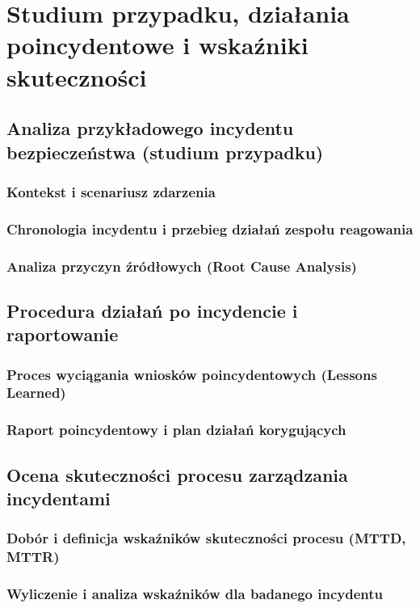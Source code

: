 \chapter{Studium przypadku, działania poincydentowe i wskaźniki skuteczności}\label{ch:studium-przypadku}

\section{Analiza przykładowego incydentu bezpieczeństwa (studium przypadku)}\label{sec:studium-przypadku}

\subsection{Kontekst i scenariusz zdarzenia}\label{subsec:scenariusz-zdarzenia}

\subsection{Chronologia incydentu i przebieg działań zespołu reagowania}\label{subsec:chronologia-incydentu}

\subsection{Analiza przyczyn źródłowych (Root Cause Analysis)}\label{subsec:rca}

\section{Procedura działań po incydencie i raportowanie}\label{sec:dzialania-poincydentowe}

\subsection{Proces wyciągania wniosków poincydentowych (Lessons Learned)}\label{subsec:lessons-learned}

\subsection{Raport poincydentowy i plan działań korygujących}\label{subsec:raport-poincydentowy}

\section{Ocena skuteczności procesu zarządzania incydentami}\label{sec:ocena-skutecznosci}

\subsection{Dobór i definicja wskaźników skuteczności procesu (MTTD, MTTR)}\label{subsec:definicja-wskaznikow}

\subsection{Wyliczenie i analiza wskaźników dla badanego incydentu}\label{subsec:wyliczenie-wskaznikow}
